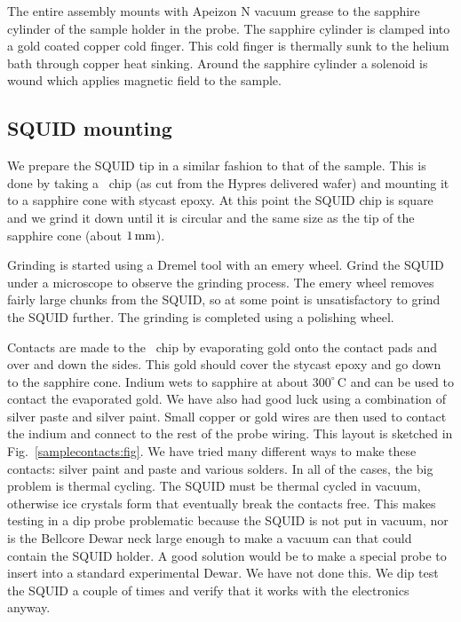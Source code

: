 The entire assembly mounts with Apeizon N vacuum grease\cite{apiezon}
to the sapphire cylinder of the
sample holder in the probe. 
The sapphire cylinder is clamped into a gold coated 
copper cold finger. This cold finger is thermally sunk to the helium bath
through 
copper heat sinking. Around the sapphire cylinder a solenoid is wound
which applies magnetic field to the sample. 

\subsection{SQUID mounting}
\label{app:squid_mounting}

We prepare the SQUID tip in a similar fashion to that of the
sample. 
This is done by taking a
\squid\ chip (as cut from the Hypres delivered wafer) 
and mounting it to a sapphire cone with stycast epoxy. 
At this point the SQUID chip is square and we grind it down
until it is circular and the same size as the tip of the
sapphire cone (about $1\,\mathrm{mm}$). 

Grinding is started using a Dremel
tool with an emery wheel. Grind the SQUID under a microscope to observe
the grinding process. The emery wheel removes fairly large 
chunks from the SQUID, so at some point is unsatisfactory to 
grind the SQUID further. The grinding is completed using a
polishing wheel. 

Contacts are made to the \squid\ chip by
evaporating gold onto the contact pads and over and down the sides. 
This gold should cover the stycast epoxy and go down to the sapphire cone. 
Indium wets to sapphire at about $300^{\circ}\,\mathrm{C}$ and can be used to 
contact the evaporated gold. We have also had good luck
using a combination of silver paste and silver paint.
Small copper or gold wires are then
used to contact the indium and connect to the rest of the probe wiring.
This layout is sketched in Fig.~\ref{samplecontacts:fig}. 
We have tried many different ways to make these contacts: silver paint and
paste and various solders. In all of the cases, the big problem is 
thermal cycling. The SQUID must be thermal cycled in vacuum, otherwise
ice crystals form that eventually break the contacts free. 
This makes testing in a dip probe problematic because the SQUID is not
put in vacuum, nor is the Bellcore Dewar neck large enough to make
a vacuum can that could contain the SQUID holder. 
A good solution would be to make a special probe to insert
into a standard experimental Dewar. We have not done this. 
We dip test the SQUID a couple of times and verify that it
works with the electronics anyway.

